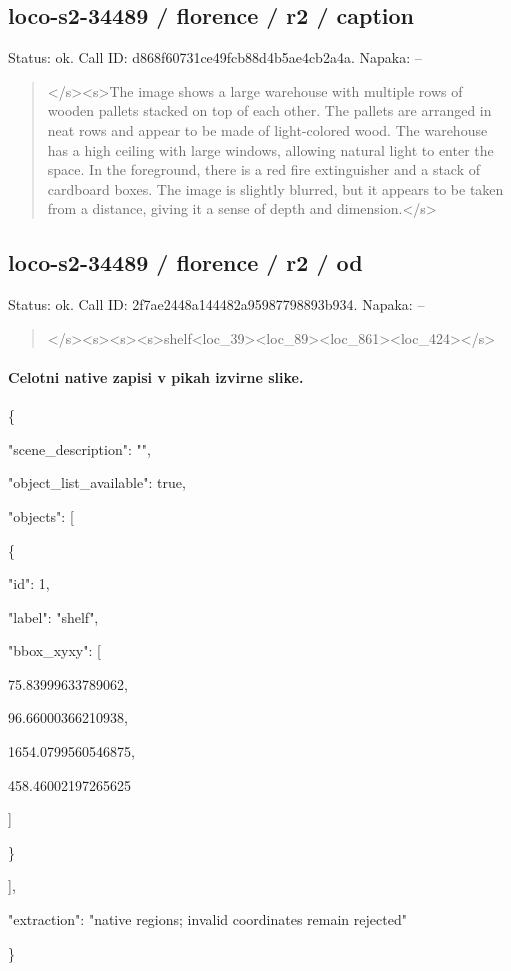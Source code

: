 \documentclass[10pt,a4paper]{article}
\begin{document}
\subsection*{loco-s2-34489 / florence / r2 / caption}
Status: ok. Call ID: d868f60731ce49fcb88d4b5ae4cb2a4a. Napaka: --
\begin{quote}\footnotesize
</s>\allowbreak{}<s>\allowbreak{}The image shows a large warehouse with multiple rows of wooden pallets stacked on top of each other. The pallets are arranged in neat rows and appear to be made of light-colored wood. The warehouse has a high ceiling with large windows,\allowbreak{} allowing natural light to enter the space. In the foreground,\allowbreak{} there is a red fire extinguisher and a stack of cardboard boxes. The image is slightly blurred,\allowbreak{} but it appears to be taken from a distance,\allowbreak{} giving it a sense of depth and dimension.</s>\allowbreak{}
\end{quote}
\subsection*{loco-s2-34489 / florence / r2 / od}
Status: ok. Call ID: 2f7ae2448a144482a95987798893b934. Napaka: --
\begin{quote}\footnotesize
</s>\allowbreak{}<s>\allowbreak{}<s>\allowbreak{}<s>\allowbreak{}shelf<loc\_39>\allowbreak{}<loc\_8\allowbreak{}9>\allowbreak{}<loc\_861>\allowbreak{}<loc\_424>\allowbreak{}</s>\allowbreak{}
\end{quote}
\paragraph{Celotni native zapisi v pikah izvirne slike.}
\{\par
  "scene\_description":\allowbreak{} "",\allowbreak{}\par
  "object\_list\_available":\allowbreak{} true,\allowbreak{}\par
  "objects":\allowbreak{} [\par
    \{\par
      "id":\allowbreak{} 1,\allowbreak{}\par
      "label":\allowbreak{} "shelf",\allowbreak{}\par
      "bbox\_xyxy":\allowbreak{} [\par
        75.83999633789062,\allowbreak{}\par
        96.66000366210938,\allowbreak{}\par
        1654.0799560546875,\allowbreak{}\par
        458.46002197265625\par
      ]\par
    \}\par
  ],\allowbreak{}\par
  "extraction":\allowbreak{} "native regions; invalid coordinates remain rejected"\par
\}
\end{document}
